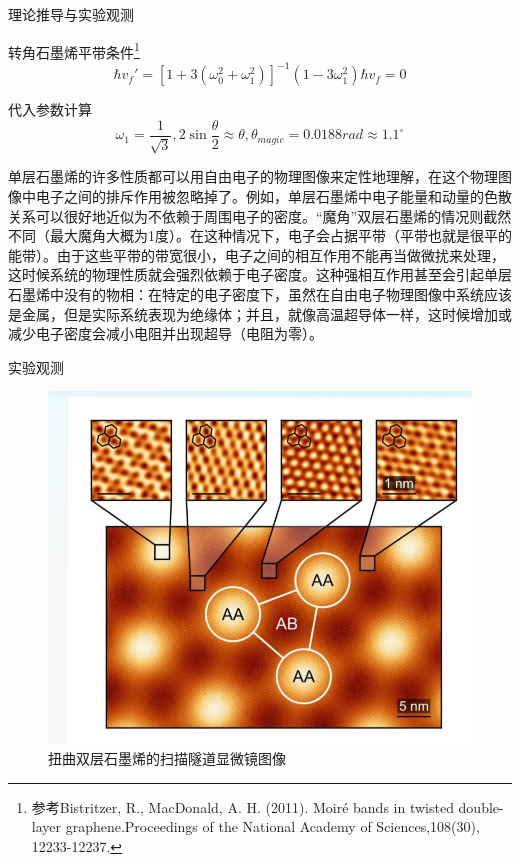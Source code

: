 \documentclass{beamer}
\begin{document}
\begin{frame}{理论推导与实验观测}
    \begin{exampleblock}{转角石墨烯平带条件\footnote{参考Bistritzer, R.,  MacDonald, A. H. (2011). Moiré bands in twisted double-layer graphene.Proceedings of the National Academy of Sciences,108(30), 12233-12237.}} %
        \begin{equation*}
            \hbar v_f '=[1+3(\omega_0 ^2 +\omega_1 ^2)]^{-1}(1-3\omega_1 ^2)\hbar v_f=0
        \end{equation*}
    \end{exampleblock}
    \begin{exampleblock}{代入参数计算}
     \begin{equation*}
     \omega_1=\frac{1}{\sqrt{3}},2\sin{\frac{\theta}{2}}\approx \theta,\theta_{magic}=0.0188rad \approx 1.1^\circ
        \end{equation*}
    \end{exampleblock}
\end{frame}

\begin{frame}
   单层石墨烯的许多性质都可以用自由电子的物理图像来定性地理解，在这个物理图像中电子之间的排斥作用被忽略掉了。例如，单层石墨烯中电子能量和动量的色散关系可以很好地近似为不依赖于周围电子的密度。“魔角”双层石墨烯的情况则截然不同（最大魔角大概为1度）。在这种情况下，电子会占据平带（平带也就是很平的能带）。由于这些平带的带宽很小，电子之间的相互作用不能再当做微扰来处理，这时候系统的物理性质就会强烈依赖于电子密度。这种强相互作用甚至会引起单层石墨烯中没有的物相：在特定的电子密度下，虽然在自由电子物理图像中系统应该是金属，但是实际系统表现为绝缘体；并且，就像高温超导体一样，这时候增加或减少电子密度会减小电阻并出现超导（电阻为零）。
\end{frame}


\begin{frame}{实验观测}
    \begin{figure}[htpb]
        \centering
        \includegraphics[width=0.5\linewidth]{pic/sm.png}
        
        \caption{扭曲双层石墨烯的扫描隧道显微镜图像}
    \end{figure}
\end{frame}
\end{document}

